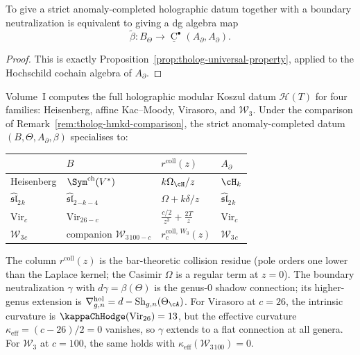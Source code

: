 \begin{proposition}
\label{prop:tholog-universal-boundary-lift}
To give a strict anomaly-completed holographic datum together with a boundary neutralization is equivalent to giving a dg algebra map
\[
\widetilde\beta:B_{\Theta}\longrightarrow \underline{\operatorname{C}}^{\bullet}(A_{\partial},A_{\partial}).
\]
\end{proposition}

\begin{proof}
This is exactly Proposition~\ref{prop:tholog-universal-property}, applied to the Hochschild cochain algebra of \(A_{\partial}\).
\end{proof}

\begin{remark}
\label{rem:tholog-computed-examples}
Volume~I computes the full holographic modular Koszul datum
$\mathcal{H}(T)$ for four families: Heisenberg, affine
Kac--Moody, Virasoro, and $\mathcal W_3$.
Under the comparison of
Remark~\ref{rem:tholog-hmkd-comparison}, the strict
anomaly-completed datum $(B,\Theta,A_\partial,\beta)$
specialises to:
\begin{center}
\renewcommand{\arraystretch}{1.15}
\begin{tabular}{llll}
& $B$ & $r^{\mathrm{coll}}(z)$ & $A_\partial$ \\
\hline
Heisenberg & $\Sym^{\mathrm{ch}}(V^*)$ & $k\Omega_{\cH}/z$ & $\cH_k$ \\
$\widehat{\mathfrak{sl}}_2{}_k$
 & $\widehat{\mathfrak{sl}}_2{}_{-k-4}$
 & $\Omega + k\delta/z$
 & $\widehat{\mathfrak{sl}}_2{}_k$ \\
$\mathrm{Vir}_c$
 & $\mathrm{Vir}_{26-c}$
 & $\frac{c/2}{z^3}+\frac{2T}{z}$
 & $\mathrm{Vir}_c$ \\
$\mathcal W_3{}_c$
 & companion $\mathcal W_3{}_{100-c}$
 & $r_c^{\mathrm{coll},\,W_3}(z)$
 & $\mathcal W_3{}_c$
\end{tabular}
\end{center}
\noindent
The column $r^{\mathrm{coll}}(z)$ is the bar-theoretic
collision residue (pole orders one lower than the Laplace kernel;
the Casimir $\Omega$ is a regular term at $z=0$).
The boundary neutralization $\gamma$ with
$d\gamma=\beta(\Theta)$ is the genus-$0$ shadow connection;
its higher-genus extension is
$\nabla^{\mathrm{hol}}_{g,n}=d-\mathrm{Sh}_{g,n}(\Theta_\cA)$.
For Virasoro at $c=26$, the intrinsic curvature is
$\kappaChHodge(\mathrm{Vir}_{26})=13$, but the effective curvature
$\kappa_{\mathrm{eff}}=(c-26)/2=0$ vanishes, so $\gamma$
extends to a flat connection at all genera.
For $\mathcal W_3$ at $c=100$, the same holds with
$\kappa_{\mathrm{eff}}(\mathcal W_3{}_{100})=0$.
\end{remark}

